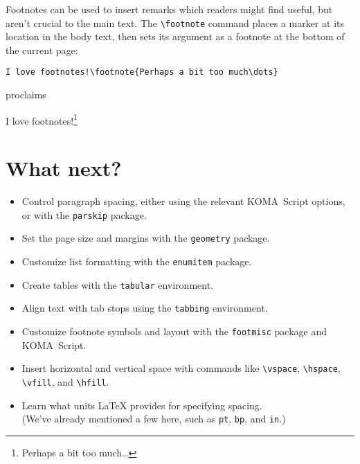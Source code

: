 Footnotes can be used to insert remarks which readers might
find useful, but aren't crucial to the main text.
The \verb|\footnote| command places a marker at its location in the
body text, then sets its argument as a footnote at the bottom of the current
page:
\begin{leftfigure}
\begin{lstlisting}
I love footnotes!\footnote{Perhaps a bit too much\dots}
\end{lstlisting}
\end{leftfigure}
proclaims
\begin{leftfigure}
\lm%
I love footnotes!\footnote{Perhaps a bit too much\dots}
\end{leftfigure}

\section{What next?}
\begin{itemize}
\item Control paragraph spacing, either using the relevant
KOMA~Script options, or with the \texttt{parskip} package.
\item Set the page size and margins with the \texttt{geometry} package.
\item Customize list formatting with the \texttt{enumitem} package.
\item Create tables with the \texttt{tabular} environment.
\item Align text with tab stops using the \texttt{tabbing} environment.
\item Customize footnote symbols and layout with the
    \texttt{footmisc} package and KOMA~Script.
\item Insert horizontal and vertical space with commands like
    \verb|\vspace|, \verb|\hspace|, \verb|\vfill|, and \verb|\hfill|.
\item Learn what units \LaTeX{} provides for specifying spacing. \\
    (We've already mentioned a few here, such as
    \texttt{pt}, \texttt{bp}, and \texttt{in}.)
\end{itemize}
